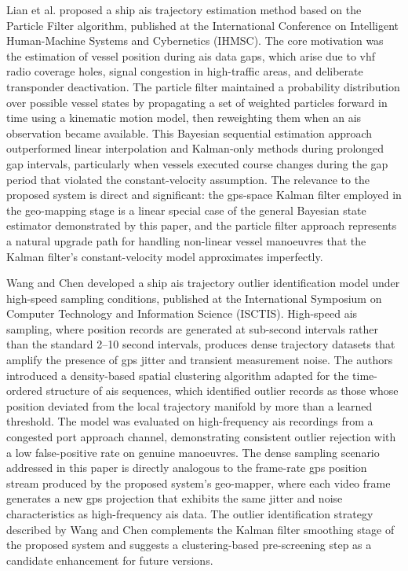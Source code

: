 Lian et al.\cite{Lian2019} proposed a ship \gls{ais} trajectory estimation method based on the Particle Filter algorithm, published at the International Conference on Intelligent Human-Machine Systems and Cybernetics (IHMSC). The core motivation was the estimation of vessel position during \gls{ais} data gaps, which arise due to \gls{vhf} radio coverage holes, signal congestion in high-traffic areas, and deliberate transponder deactivation. The particle filter maintained a probability distribution over possible vessel states by propagating a set of weighted particles forward in time using a kinematic motion model, then reweighting them when an \gls{ais} observation became available. This Bayesian sequential estimation approach outperformed linear interpolation and Kalman-only methods during prolonged gap intervals, particularly when vessels executed course changes during the gap period that violated the constant-velocity assumption. The relevance to the proposed system is direct and significant: the \gls{gps}-space Kalman filter employed in the geo-mapping stage is a linear special case of the general Bayesian state estimator demonstrated by this paper, and the particle filter approach represents a natural upgrade path for handling non-linear vessel manoeuvres that the Kalman filter's constant-velocity model approximates imperfectly.

Wang and Chen \cite{Wang2024a} developed a ship \gls{ais} trajectory outlier identification model under high-speed sampling conditions, published at the International Symposium on Computer Technology and Information Science (ISCTIS). High-speed \gls{ais} sampling, where position records are generated at sub-second intervals rather than the standard 2--10 second intervals, produces dense trajectory datasets that amplify the presence of \gls{gps} jitter and transient measurement noise. The authors introduced a density-based spatial clustering algorithm adapted for the time-ordered structure of \gls{ais} sequences, which identified outlier records as those whose position deviated from the local trajectory manifold by more than a learned threshold. The model was evaluated on high-frequency \gls{ais} recordings from a congested port approach channel, demonstrating consistent outlier rejection with a low false-positive rate on genuine manoeuvres. The dense sampling scenario addressed in this paper is directly analogous to the frame-rate \gls{gps} position stream produced by the proposed system's geo-mapper, where each video frame generates a new \gls{gps} projection that exhibits the same jitter and noise characteristics as high-frequency \gls{ais} data. The outlier identification strategy described by Wang and Chen complements the Kalman filter smoothing stage of the proposed system and suggests a clustering-based pre-screening step as a candidate enhancement for future versions.

